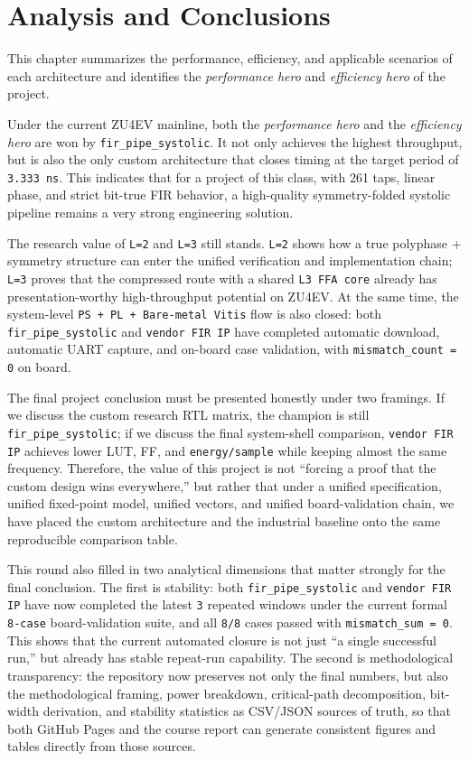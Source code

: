 \section{Analysis and Conclusions}

This chapter summarizes the performance, efficiency, and applicable scenarios of each architecture and identifies the \textit{performance hero} and \textit{efficiency hero} of the project.

Under the current ZU4EV mainline, both the \textit{performance hero} and the \textit{efficiency hero} are won by \texttt{fir\_pipe\_systolic}. It not only achieves the highest throughput, but is also the only custom architecture that closes timing at the target period of \texttt{3.333 ns}. This indicates that for a project of this class, with 261 taps, linear phase, and strict bit-true FIR behavior, a high-quality symmetry-folded systolic pipeline remains a very strong engineering solution.

The research value of \texttt{L=2} and \texttt{L=3} still stands. \texttt{L=2} shows how a true polyphase + symmetry structure can enter the unified verification and implementation chain; \texttt{L=3} proves that the compressed route with a shared \texttt{L3 FFA core} already has presentation-worthy high-throughput potential on ZU4EV. At the same time, the system-level \texttt{PS + PL + Bare-metal Vitis} flow is also closed: both \texttt{fir\_pipe\_systolic} and \texttt{vendor FIR IP} have completed automatic download, automatic UART capture, and on-board case validation, with \texttt{mismatch\_count = 0} on board.

The final project conclusion must be presented honestly under two framings. If we discuss the custom research RTL matrix, the champion is still \texttt{fir\_pipe\_systolic}; if we discuss the final system-shell comparison, \texttt{vendor FIR IP} achieves lower LUT, FF, and \texttt{energy/sample} while keeping almost the same frequency. Therefore, the value of this project is not ``forcing a proof that the custom design wins everywhere,'' but rather that under a unified specification, unified fixed-point model, unified vectors, and unified board-validation chain, we have placed the custom architecture and the industrial baseline onto the same reproducible comparison table.

This round also filled in two analytical dimensions that matter strongly for the final conclusion. The first is stability: both \texttt{fir\_pipe\_systolic} and \texttt{vendor FIR IP} have now completed the latest \texttt{3} repeated windows under the current formal \texttt{8-case} board-validation suite, and all \texttt{8/8} cases passed with \texttt{mismatch\_sum = 0}. This shows that the current automated closure is not just ``a single successful run,'' but already has stable repeat-run capability. The second is methodological transparency: the repository now preserves not only the final numbers, but also the methodological framing, power breakdown, critical-path decomposition, bit-width derivation, and stability statistics as CSV/JSON sources of truth, so that both GitHub Pages and the course report can generate consistent figures and tables directly from those sources.
